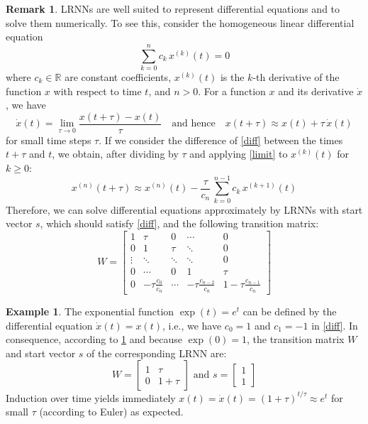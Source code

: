 \documentclass[twoside,11pt]{article}
\theoremstyle{definition}
\newtheorem{exmp}{Example}
\newtheorem{remk}{Remark}
\begin{document}
\begin{remk}\label{rem}
LRNNs are well suited to represent differential equations and to solve them
numerically. To see this, consider the homogeneous linear differential equation
\begin{equation}
	\sum_{k=0}^n c_k\,x^{(k)}(t) = 0 \label{diff}
\end{equation}
where $c_k \in \mathbb{R}$ are constant coefficients, $x^{(k)}(t)$ is the $k$-th
derivative of the function $x$ with respect to time $t$, and $n>0$. For a
function $x$ and its derivative $\dot{x}$, we have
\begin{equation}
  \dot{x}(t) = \lim\limits_{\tau \to 0} \frac{x(t+\tau)-x(t)}{\tau}
	\quad\text{and hence}\quad
  x(t+\tau) \approx x(t) + \tau\,\dot{x}(t) \label{limit}
\end{equation}
for small time steps $\tau$. If we consider the difference of \cref{diff}
between the times $t+\tau$ and $t$, we obtain, after dividing by $\tau$ and
applying \cref{limit} to $x^{(k)}(t)$ for $k \ge 0$:
\[
	x^{(n)}(t+\tau)
	\approx x^{(n)}(t) - \frac{\tau}{c_n}\,\sum_{k=0}^{n-1} c_k\,x^{(k+1)}(t)
\]
Therefore, we can solve differential equations approximately by LRNNs with
start vector $s$, which should satisfy \cref{diff}, and the following transition
matrix:
\[ W = \left[ \begin{array}{*{5}{c}}
	1 & \tau & 0 & \cdots & 0\\
	0 & 1 & \tau & \ddots & 0\\
	\vdots & \ddots & \ddots & \ddots & 0\\
	0 & \cdots & 0 & 1 & \tau\\
	0 & -\tau \frac{c_0}{c_n} & \cdots & -\tau \frac{c_{n-2}}{c_n} & 1\!-\!\tau \frac{c_{n-1}}{c_n}
\end{array} \right] \]
\end{remk}

\begin{exmp}\label{exp}
The exponential function $\exp(t) = e^t$ can be defined by the differential
equation $\dot{x}(t) = x(t)$, i.e., we have $c_0 = 1$ and $c_1 = -1$ in
\cref{diff}. In consequence, according to \cref{rem} and because $\exp(0)=1$,
the transition matrix $W$ and start vector $s$ of the corresponding LRNN are:
\[ W = \left[ \begin{array}{cc}
	1 & \tau\\
	0 & 1\!+\!\tau
   \end{array} \right]
   \text{~and~} s = \left[ \begin{array}{c}
	1\\
	1
   \end{array} \right]
\]
Induction over time yields immediately $x(t) = \dot{x}(t) = (1+\tau)^{t/\tau}
\approx e^t$ for small $\tau$ (according to Euler) as expected.
\end{exmp}
\end{document}
